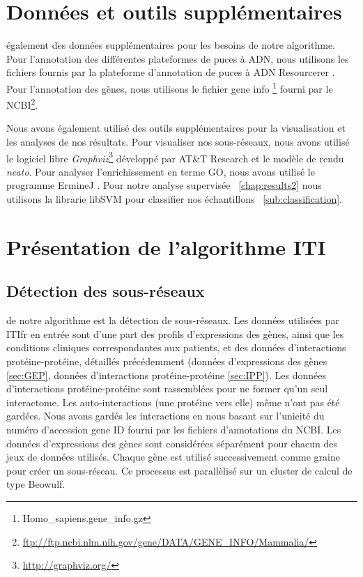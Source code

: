	\section{\textcolor{green!45!black}{Données et outils supplémentaires}}
		 également des données supplémentaires pour les besoins de notre algorithme.
			Pour l'annotation des différentes plateformes de puces à \acs{ADN}, nous utilisons les fichiers fournis par la plateforme d'annotation de puces à \acs{ADN} Resourcerer \citep{Tsai2001}.
			Pour l'annotation des gènes, nous utilisons le fichier gene info \footnote{Homo\_sapiens.gene\_info.gz} fourni par le \acs{NCBI}\footnote{\url{ftp://ftp.ncbi.nlm.nih.gov/gene/DATA/GENE_INFO/Mammalia/}}.

			Nous avons également utilisé des outils supplémentaires pour la visualisation et les analyses de nos résultats.
			Pour visualiser nos sous-réseaux, nous avons utilisé le logiciel libre \emph{Graphviz}\footnote{\url{http://graphviz.org/}} développé par AT\&T Research et le modèle de rendu \emph{neato}.
			Pour analyser l'enrichissement en terme GO, nous avons utilisé le programme ErmineJ \citep{Gillis2010}.
			Pour notre analyse supervisée ~\ref{chap:results2} nous utilisons la librarie libSVM \citep{Chang2007} pour classifier nos échantillons ~\ref{sub:classification}.

			\pagebreak

	\section{\textcolor{green!45!black}{Présentation de l'algorithme ITI}}

		\subsection{\textcolor{green!45!black}{Détection des sous-réseaux}}
			 de notre algorithme est la détection de sous-réseaux.
			Les données utilisées par \acs{ITIfr} en entrée sont d'une part des profils d'expressions des gènes, ainsi que les conditions cliniques correspondantes aux patients, et des données d'interactions protéine-protéine, détaillés précédemment (données d'expressions des gènes \ref{sec:GEP}, données d'interactions protéine-protéine \ref{sec:IPP}).
			Les données d'interactions protéine-protéine sont rassemblées pour ne former qu'un seul interactome.
			Les auto-interactions (une protéine vers elle) même n'ont pas été gardées.
			Nous avons gardés les interactions en nous basant sur l'unicité du numéro d'accession gene ID fourni par les fichiers d'annotations du NCBI. 
			Les données d'expressions des gènes sont considérées séparément pour chacun des jeux de données utilisés.
			Chaque gène est utilisé successivement comme graine pour créer un sous-réseau.
			Ce processus est parallèlisé sur un cluster de calcul de type Beowulf.




